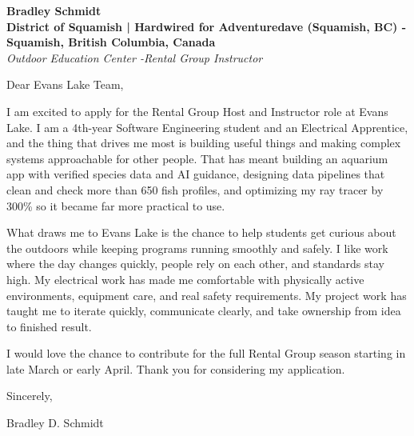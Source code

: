 \documentclass[11pt]{article}
\begin{document}
\textbf{Bradley Schmidt}\\
\vspace{0.5em}
\textbf{District of Squamish | Hardwired for Adventuredave (Squamish, BC) - Squamish, British Columbia, Canada}\\
\textit{Outdoor Education Center -Rental Group Instructor}

Dear Evans Lake Team,

\par

I am excited to apply for the Rental Group Host and Instructor role at Evans Lake. I am a 4th-year Software Engineering student and an Electrical Apprentice, and the thing that drives me most is building useful things and making complex systems approachable for other people. That has meant building an aquarium app with verified species data and AI guidance, designing data pipelines that clean and check more than 650 fish profiles, and optimizing my ray tracer by 300\% so it became far more practical to use.

\par

What draws me to Evans Lake is the chance to help students get curious about the outdoors while keeping programs running smoothly and safely. I like work where the day changes quickly, people rely on each other, and standards stay high. My electrical work has made me comfortable with physically active environments, equipment care, and real safety requirements. My project work has taught me to iterate quickly, communicate clearly, and take ownership from idea to finished result.

\par

I would love the chance to contribute for the full Rental Group season starting in late March or early April. Thank you for considering my application.

\par

Sincerely,

\par

Bradley D. Schmidt
\end{document}
